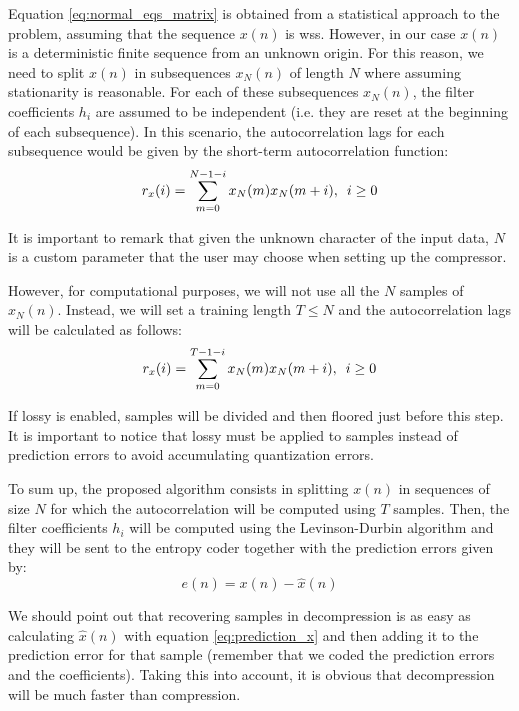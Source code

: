 Equation \ref{eq:normal_eqs_matrix} is obtained from a statistical approach to the problem, assuming that the sequence $x(n)$ is \acrshort{wss}. However, in our case $x(n)$ is a deterministic finite sequence from an unknown origin. For this reason, we need to split $x(n)$ in subsequences $x_N(n)$ of length $N$ where assuming stationarity is reasonable. For each of these subsequences $x_N(n)$, the filter coefficients $h_i$ are assumed to be independent (i.e. they are reset at the beginning of each subsequence). In this scenario, the autocorrelation lags for each subsequence would be given by the short-term autocorrelation function:
\begin{equation}
r_x(i) = \sum_{m=0}^{N-1-i} x_N(m) x_N(m+i) ,\hspace{0.5em} i \geq 0
\end{equation}

It is important to remark that given the unknown character of the input data, $N$ is a custom parameter that the user may choose when setting up the compressor.

However, for computational purposes, we will not use all the $N$ samples of $x_N(n)$. Instead, we will set a training length $T \leq N$ and the autocorrelation lags will be calculated as follows:
\begin{equation}
	r_x(i) = \sum_{m=0}^{T-1-i} x_N(m) x_N(m+i) ,\hspace{0.5em} i \geq 0
\end{equation}

If lossy is enabled, samples will be divided and then floored just before this step. It is important to notice that lossy must be applied to samples instead of prediction errors to avoid accumulating quantization errors.

To sum up, the proposed algorithm consists in splitting $x(n)$ in sequences of size $N$ for which the autocorrelation will be computed using $T$ samples. Then, the filter coefficients $h_i$ will be computed using the Levinson-Durbin algorithm and they will be sent to the entropy coder together with the prediction errors given by:
\begin{equation}
e(n) = x(n) - \hat{x}(n)
\end{equation}

We should point out that recovering samples in decompression is as easy as calculating $\hat{x}(n)$ with equation \ref{eq:prediction_x} and then adding it to the prediction error for that sample (remember that we coded the prediction errors and the coefficients). Taking this into account, it is obvious that decompression will be much faster than compression.

